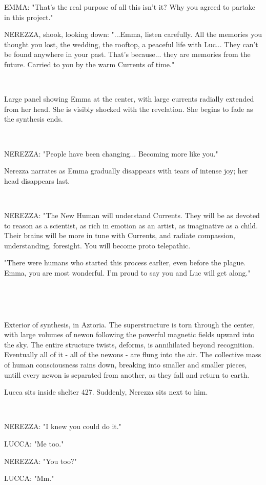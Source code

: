 \documentclass[11pt]{article}
\begin{document}
EMMA: "That's the real purpose of all this isn't it?
Why you agreed to partake in this project."

NEREZZA, shook, looking down: "...Emma, listen carefully.
All the memories you thought you lost, the wedding, the rooftop, a peaceful life with Luc... They can't be found anywhere in your past. 
That's because... they are memories from the future.
Carried to you by the warm Currents of time."

\ 

Large panel showing Emma at the center, with large currents radially extended from her head.
She is visibly shocked with the revelation.
She begins to fade as the synthesis ends. 

\ 

NEREZZA: "People have been changing...
Becoming more like you."

Nerezza narrates as Emma gradually disappears with tears of intense joy; her head disappears last.

\ 

NEREZZA: "The New Human will understand Currents. 
They will be as devoted to reason as a scientist, as rich in emotion as an artist, as imaginative as a child.
Their brains will be more in tune with Currents, and radiate compassion, understanding, foresight.
You will become proto telepathic.

"There were humans who started this process earlier, even before the plague.
Emma, you are most wonderful.
I'm proud to say you and Luc will get along."

\ 

\ 

Exterior of synthesis, in Aztoria.
The superstructure is torn through the center, with large volumes of newon following the powerful magnetic fields upward into the sky. 
The entire structure twists, deforms, is annihilated beyond recognition.
Eventually all of it - all of the newons - are flung into the air.
The collective mass of human consciousness rains down, breaking into smaller and smaller pieces, untill every newon is separated from another, as they fall and return to earth. 

Lucca sits inside shelter 427. 
Suddenly, Nerezza sits next to him.

\ 

NEREZZA: "I knew you could do it."

LUCCA: "Me too."

NEREZZA: "You too?"

LUCCA: "Mm."
\end{document}
